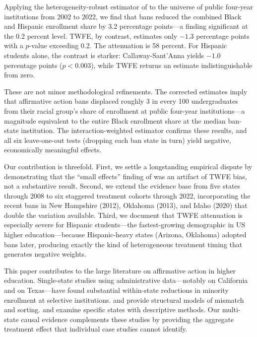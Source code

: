 \documentclass[12pt]{article}
\begin{document}
Applying the heterogeneity-robust estimator of \citet{callaway2021difference} to the universe of public four-year institutions from 2002 to 2022, we find that bans reduced the combined Black and Hispanic enrollment share by 3.2 percentage points---a finding significant at the 0.2 percent level. TWFE, by contrast, estimates only $-1.3$ percentage points with a $p$-value exceeding 0.2. The attenuation is 58 percent. For Hispanic students alone, the contrast is starker: Callaway-Sant'Anna yields $-1.0$ percentage points ($p < 0.003$), while TWFE returns an estimate indistinguishable from zero.

These are not minor methodological refinements. The corrected estimates imply that affirmative action bans displaced roughly 3 in every 100 undergraduates from their racial group's share of enrollment at public four-year institutions---a magnitude equivalent to the entire Black enrollment share at the median ban-state institution. The \citet{sun2021estimating} interaction-weighted estimator confirms these results, and all six leave-one-out tests (dropping each ban state in turn) yield negative, economically meaningful effects.

Our contribution is threefold. First, we settle a longstanding empirical dispute by demonstrating that the ``small effects'' finding of \citet{hinrichs2012impact} was an artifact of TWFE bias, not a substantive result. Second, we extend the evidence base from five states through 2008 to six staggered treatment cohorts through 2022, incorporating the recent bans in New Hampshire (2012), Oklahoma (2013), and Idaho (2020) that double the variation available. Third, we document that TWFE attenuation is especially severe for Hispanic students---the fastest-growing demographic in US higher education---because Hispanic-heavy states (Arizona, Oklahoma) adopted bans later, producing exactly the kind of heterogeneous treatment timing that generates negative weights.

This paper contributes to the large literature on affirmative action in higher education. Single-state studies using administrative data---notably \citet{bleemer2022affirmative} on California and \citet{hinrichs2014racial} on Texas---have found substantial within-state reductions in minority enrollment at selective institutions. \citet{arcidiacono2016affirmative} and \citet{arcidiacono2014university} provide structural models of mismatch and sorting. \citet{long2004does} and \citet{backes2012impact} examine specific states with descriptive methods. Our multi-state causal evidence complements these studies by providing the aggregate treatment effect that individual case studies cannot identify.
\end{document}

